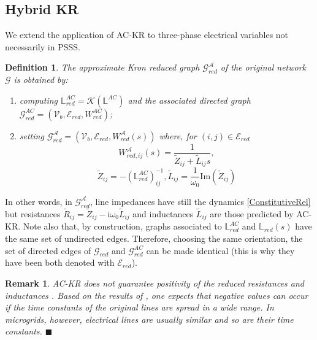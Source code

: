 \documentclass[a4paper]{article}
\theoremstyle{plain}
\newtheorem{rmk}{Remark}
\newtheorem{defn}{Definition}
\def\Lset{\mathbb{L}}
\newcommand{\AAA}{{\mathcal A}}
\newcommand{\EE}{{\mathcal E}}
\newcommand{\GG}{{\mathcal G}}
\newcommand{\KK}{{\mathcal K}}
\newcommand{\VV}{{\mathcal V}}
\begin{document}
      \subsection{Hybrid KR}
\label{subsec:HybridKR}
     We extend the application of AC-KR to three-phase electrical variables not necessarily in PSSS.
     \begin{defn}
     	The approximate Kron reduced graph $\GG_{red}^{\AAA}$ of the original network $\GG$ is obtained by:
     	\begin{enumerate}[1)]
     		\item computing $\Lset_{red}^{AC}=\KK\left( \Lset^{AC}\right)$ and the associated directed graph $\GG_{red}^{AC}=\left( \VV_b, \EE_{red}, W_{red}^{AC} \right)$;
     		\item setting $\GG_{red}^{\AAA}=\left( \VV_b, \EE_{red}, W_{red}^{\AAA}(s) \right)$ where, for $(i,j)\in\EE_{red}$
     		\begin{equation}
\label{eq:Wred_hKR}
     		W_{red,ij}^{\AAA}(s) =\frac{1}{\tilde Z_ {ij}+\tilde L_{ij}s}, 
     		\end{equation}
     	\begin{equation}
\label{eq:star}
     		\tilde Z_{ij}=-\left(\Lset_{red}^{AC}\right)_{ij}^{-1}, \tilde L_{ij}=\frac{1}{\omega_0}\text{Im}\left(\tilde Z_{ij} \right)
     		\end{equation}
     	\end{enumerate}
     \end{defn}
     In other words, in $\GG_{red}^{\AAA}$, line impedances have still the dynamics \eqref{ConstitutiveRel} but resistances $\tilde R_{ij}=\tilde Z_{ij}-\mathrm i\omega_0 \tilde L_{ij}$ and inductances $\tilde L_{ij}$ are those predicted by AC-KR. Note also that, by construction, graphs associated to $\Lset_{red}^{AC}$ and $\Lset_{red}(s)$ have the same set of undirected edges. Therefore, choosing the same orientation, the set of directed edges of $\GG_{red}$ and $\GG_{red}^{AC}$ can be made identical (this is why they have been both denoted with $\EE_{red}$).
     \begin{rmk}
     	AC-KR does not guarantee positivity of the reduced resistances and inductances 	\cite{dhople2014synchronization}. Based on the results of \cite{caliskan2012kron}, one expects that negative values can occur if the time constants of the original lines are spread in a wide range. In microgrids, however, electrical lines are usually similar and so are their time constants. 
\hspace{98mm}$\blacksquare$
     \end{rmk} 
\end{document}
